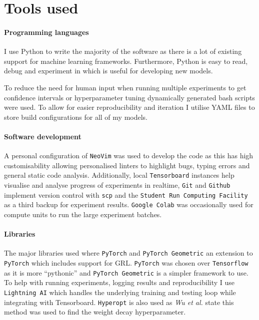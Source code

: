 \section{Tools used}


\paragraph{Programming languages}
I use Python to write the majority of the software as there is a lot of existing support for machine learning frameworks.
Furthermore, Python is easy to read, debug and experiment in which is useful for developing new models.

To reduce the need for human input when running multiple experiments to get confidence intervals or hyperparameter tuning dynamically generated bash scripts were used.
To allow for easier reproducibility and iteration I utilise YAML files to store build configurations for all of my models.

\paragraph{Software development}

A personal configuration of \texttt{NeoVim} was used to develop the code as this has high customisability allowing personalised linters to highlight bugs, typing errors and general static code analysis.
Additionally, local \texttt{Tensorboard}\cite{tensorflow2015-whitepaper} instances help visualise and analyse progress of experiments in realtime, \texttt{Git} and \texttt{Github} implement version control with \texttt{scp} and the \texttt{Student Run Computing Facility} as a third backup for experiment results.
\texttt{Google Colab} was occasionally used for compute units to run the large experiment batches.

\paragraph{Libraries}
\label{sec:libraries}

The major libraries used where \texttt{PyTorch} \cite{paszke2019pytorch} and \texttt{PyTorch Geometric} \cite{Fey/Lenssen/2019} an extension to \texttt{PyTorch} which includes support for GRL.
\texttt{PyTorch} was chosen over \texttt{Tensorflow}\cite{tensorflow2015-whitepaper} as it is more ``pythonic'' and \texttt{PyTorch Geometric} is a simpler framework to use.
To help with running experiments, logging results and reproducibility I use \texttt{Lightning AI} which handles the underlying training and testing loop while integrating with Tensorboard.
\texttt{Hyperopt}\cite{bergstra2013making} is also used as \textit{Wu et al.}\cite{wu2019simplifying} state this method was used to find the weight decay hyperparameter.

